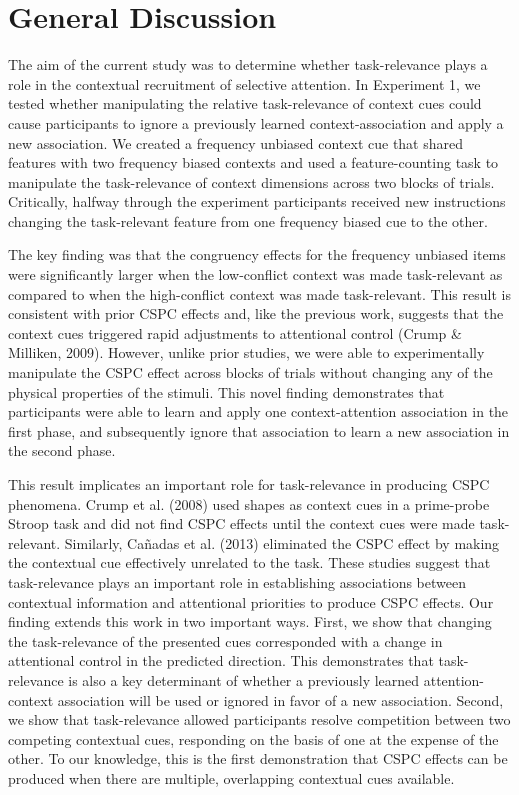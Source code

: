 \documentclass[english,,man,floatsintext]{apa6}
\begin{document}
\hypertarget{general-discussion}{%
\section{General Discussion}\label{general-discussion}}

The aim of the current study was to determine whether task-relevance plays a role in the contextual recruitment of selective attention. In Experiment 1, we tested whether manipulating the relative task-relevance of context cues could cause participants to ignore a previously learned context-association and apply a new association. We created a frequency unbiased context cue that shared features with two frequency biased contexts and used a feature-counting task to manipulate the task-relevance of context dimensions across two blocks of trials. Critically, halfway through the experiment participants received new instructions changing the task-relevant feature from one frequency biased cue to the other.

The key finding was that the congruency effects for the frequency unbiased items were significantly larger when the low-conflict context was made task-relevant as compared to when the high-conflict context was made task-relevant. This result is consistent with prior CSPC effects and, like the previous work, suggests that the context cues triggered rapid adjustments to attentional control (Crump \& Milliken, 2009). However, unlike prior studies, we were able to experimentally manipulate the CSPC effect across blocks of trials without changing any of the physical properties of the stimuli. This novel finding demonstrates that participants were able to learn and apply one context-attention association in the first phase, and subsequently ignore that association to learn a new association in the second phase.

This result implicates an important role for task-relevance in producing CSPC phenomena. Crump et al. (2008) used shapes as context cues in a prime-probe Stroop task and did not find CSPC effects until the context cues were made task-relevant. Similarly, Cañadas et al. (2013) eliminated the CSPC effect by making the contextual cue effectively unrelated to the task. These studies suggest that task-relevance plays an important role in establishing associations between contextual information and attentional priorities to produce CSPC effects. Our finding extends this work in two important ways. First, we show that changing the task-relevance of the presented cues corresponded with a change in attentional control in the predicted direction. This demonstrates that task-relevance is also a key determinant of whether a previously learned attention-context association will be used or ignored in favor of a new association. Second, we show that task-relevance allowed participants resolve competition between two competing contextual cues, responding on the basis of one at the expense of the other. To our knowledge, this is the first demonstration that CSPC effects can be produced when there are multiple, overlapping contextual cues available.
\end{document}
